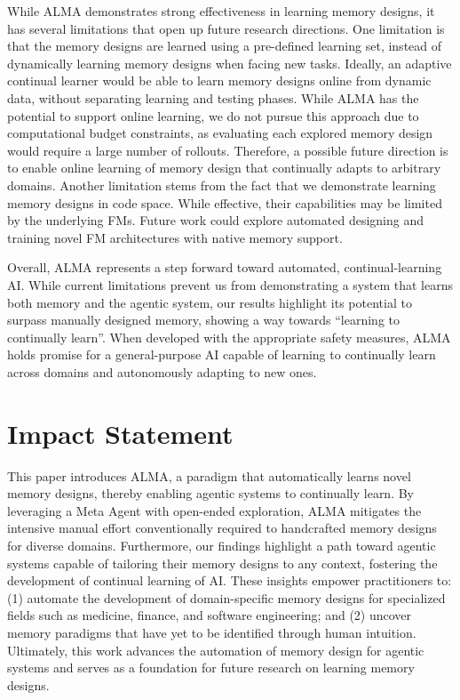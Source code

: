 \documentclass{article}
\theoremstyle{plain}
\theoremstyle{definition}
\theoremstyle{remark}
\newcommand{\ouralgo}{ALMA\xspace} %
\newif\ifcomment
\newcommand{\shout}[1]{\textcolor{violet}{\ifcomment SH: \sout{#1}\else\fi}}
\begin{document}
While \ouralgo demonstrates strong effectiveness in learning memory designs, it has several limitations that open up future research directions. One limitation is that the memory designs are learned using a pre-defined learning set, instead of dynamically learning memory designs when facing new tasks. Ideally, an adaptive continual learner would be able to learn memory designs online from dynamic data, without separating learning and testing phases. While \ouralgo has the potential to support online learning, we do not pursue this approach due to computational budget constraints, as evaluating each explored memory design would require a large number of rollouts. Therefore, a possible future direction is to enable online learning of memory design that continually adapts to arbitrary domains.
Another limitation stems from the fact that we demonstrate learning memory designs in code space. While effective, their capabilities may be limited by the underlying FMs. 
Future work could explore automated designing and training novel FM architectures with native memory support.

Overall, \ouralgo represents a step forward toward automated, continual-learning AI. While current limitations prevent us from demonstrating a system that learns both memory and the agentic system, our results highlight its potential to surpass manually designed memory, showing a way towards ``learning to continually learn''.
When developed with the appropriate safety measures, \ouralgo holds promise for a general-purpose AI capable of learning to continually learn across domains and autonomously adapting to new ones.

\section*{Impact Statement}
This paper introduces \ouralgo, a paradigm that automatically learns novel memory designs, thereby enabling agentic systems to continually learn. By leveraging a Meta Agent with open-ended exploration, \ouralgo mitigates the intensive manual effort conventionally required to handcrafted memory designs for diverse domains. Furthermore, our findings highlight a path toward agentic systems capable of tailoring their memory designs to any context, fostering the development of continual learning of AI. These insights empower practitioners to: (1) automate the development of domain-specific memory designs for specialized fields such as medicine, finance, and software engineering; and (2) uncover memory paradigms that have yet to be identified through human intuition. Ultimately, this work advances the automation of memory design for agentic systems and serves as a foundation for future research on learning memory designs.
\end{document}
